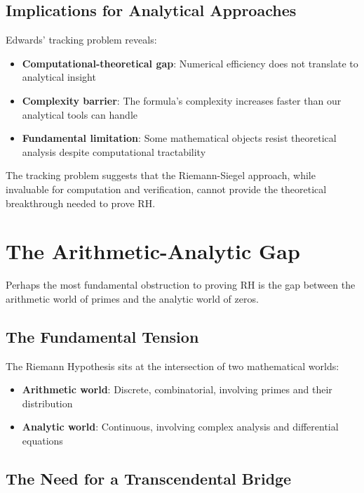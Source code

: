 \subsection{Implications for Analytical Approaches}

Edwards' tracking problem reveals:

\begin{itemize}
\item \textbf{Computational-theoretical gap}: Numerical efficiency does not translate to analytical insight
\item \textbf{Complexity barrier}: The formula's complexity increases faster than our analytical tools can handle
\item \textbf{Fundamental limitation}: Some mathematical objects resist theoretical analysis despite computational tractability
\end{itemize}

\begin{remark}
The tracking problem suggests that the Riemann-Siegel approach, while invaluable for computation and verification, cannot provide the theoretical breakthrough needed to prove RH.
\end{remark}

\section{The Arithmetic-Analytic Gap}
\label{sec:arithmetic_analytic_gap}

Perhaps the most fundamental obstruction to proving RH is the gap between the arithmetic world of primes and the analytic world of zeros.

\subsection{The Fundamental Tension}

The Riemann Hypothesis sits at the intersection of two mathematical worlds:

\begin{itemize}
\item \textbf{Arithmetic world}: Discrete, combinatorial, involving primes and their distribution
\item \textbf{Analytic world}: Continuous, involving complex analysis and differential equations
\end{itemize}

\subsection{The Need for a Transcendental Bridge}

